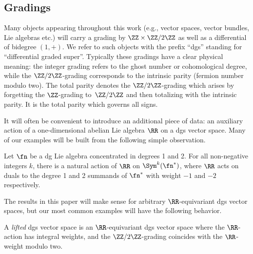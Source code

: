 \subsection{Gradings}
\label{ssec:gradings}
Many objects appearing throughout this work (e.g., vector spaces, vector bundles, Lie algebras etc.) will carry a grading by $\ZZ\times \ZZ/2\ZZ$ as well as a differential of bidegree $(1,+)$. We refer to such objects with the prefix ``dgs'' standing for ``differential graded super''. Typically these gradings have a clear physical meaning: the integer grading refers to the ghost number or cohomological degree, while the $\ZZ/2\ZZ$-grading corresponds to the intrinsic parity (fermion number modulo two). The total parity denotes the $\ZZ/2\ZZ$-grading which arises by forgetting the $\ZZ$-grading to~$\ZZ/2\ZZ$ and then totalizing with the intrinsic parity. It is the total parity which governs all signs.

It will often be convenient to introduce an additional piece of data: an auxiliary action of a one-dimensional abelian Lie algebra $\RR$ on a dgs vector space. Many of our examples will be built from the following simple observation.

\begin{eg}
	Let $\fn$ be a dg Lie algebra concentrated in degrees 1 and 2. For all non-negative integers $k$, there is a natural action of $\RR$ on $\Sym^k(\fn^*)$, where $\RR$ acts on duals to the degree 1 and 2 summands of $\fn^*$ with weight $-1$ and $-2$ respectively.
\end{eg}

The results in this paper will make sense for arbitrary $\RR$-equivariant dgs vector spaces, but our most common examples will have the following behavior.

\begin{dfn}
	A \emph{lifted} dgs vector space is an $\RR$-equivariant dgs vector space where the $\RR$-action has integral weights, and the $\ZZ/2\ZZ$-grading coincides with the $\RR$-weight modulo two.
\end{dfn}

